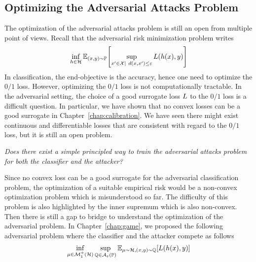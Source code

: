 \subsection{Optimizing the Adversarial Attacks Problem}

The optimization of the adversarial attacks problem is still an open from multiple point of views.
Recall that the adversarial risk minimization problem writes
\begin{align*}
    \inf_{h\in\mathcal{H}} \mathbb{E}_{(x,y)\sim\PP}\left[\sup_{x'\in\XX\mid~d(x,x')\leq\varepsilon}\loss(h(x),y)\right]
\end{align*}
In classification, the end-objective is the accuracy, hence one need to optimize the $0/1$ loss. However, optimizing the $0/1$ loss is not computationally tractable. In the adversarial setting, the choice of a good surrogate loss $L$ to the $0/1$ loss  is a difficult question. In particular, we have shown that no convex losses can be a good surrogate in Chapter~\ref{chap:calibration}. We have seen there might exist continuous and differentiable losses that are consistent with regard to the $0/1$ loss, but it is still an open problem.
\begin{tcolorbox}[colback=grund,colframe=rahmen]
    \begin{center}
        \emph{Does there exist a simple principled way to train the adversarial attacks problem for both the classifier and the attacker?}
    \end{center}
\end{tcolorbox}
Since no convex loss can be a good surrogate for the adversarial classification problem, the optimization of a suitable empirical risk  would be a  non-convex optimization problem which is misunderstood so far. The difficulty of this problem is also highlighted by the inner supremum which is also non-convex. Then there is still a gap to bridge to understand the optimization of the adversarial problem. 
In Chapter~\ref{chap:game}, we proposed the following adversarial problem where the classifier and the attacker compete as follows 
\begin{align*}
    \inf_{\mu \in\mathcal{M}_1^+(\mathcal{H})}\sup_{\QQ\in\mathcal{A}_\varepsilon(\PP)} \mathbb{E}_{\mu\sim\mathcal{H},(x,y)\sim\QQ}\left[\loss(h(x),y)\right]
\end{align*}
